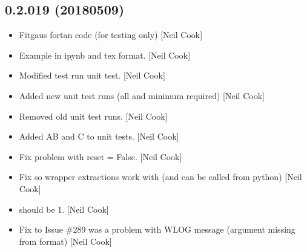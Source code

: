 \documentclass[a4paper,10pt,english]{report}
\begin{document}
\subsection{0.2.019 (2018\sphinxhyphen{}05\sphinxhyphen{}09)}
\label{\detokenize{misc/changelog:id459}}\begin{itemize}
\item {} 
Fitgaus fortan code (for testing only) {[}Neil Cook{]}

\item {} 
Example in ipynb and tex format. {[}Neil Cook{]}

\item {} 
Modified test run unit test. {[}Neil Cook{]}

\item {} 
Added new unit test runs (all and minimum required) {[}Neil Cook{]}

\item {} 
Removed old unit test runs. {[}Neil Cook{]}

\item {} 
Added  AB and C to unit tests. {[}Neil Cook{]}

\item {} 
Fix problem with reset = False. {[}Neil Cook{]}

\item {} 
Fix so wrapper extractions work with  (and can be called
from python) {[}Neil Cook{]}

\item {} 
 should be \sphinxhyphen{}1. {[}Neil Cook{]}

\item {} 
Fix to Issue \#289 \sphinxhyphen{} was a problem with WLOG message (argument missing
from format) {[}Neil Cook{]}

\end{itemize}
\end{document}
